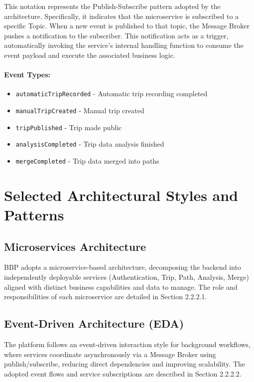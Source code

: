 This notation represents the Publish-Subscribe pattern adopted by the architecture. Specifically, it indicates that the microservice is subscribed to a specific Topic. When a new event is published to that topic, the Message Broker pushes a notification to the subscriber. This notification acts as a trigger, automatically invoking the service's internal handling function to consume the event payload and execute the associated business logic.

\paragraph{Event Types:}
\begin{itemize}
    \item \texttt{automaticTripRecorded} - Automatic trip recording completed
    \item \texttt{manualTripCreated} - Manual trip created
    \item \texttt{tripPublished} - Trip made public
    \item \texttt{analysisCompleted} - Trip data analysis finished
    \item \texttt{mergeCompleted} - Trip data merged into paths
\end{itemize}

\section{Selected Architectural Styles and Patterns}

\subsection{Microservices Architecture}
BBP adopts a microservice-based architecture, decomposing the backend into independently deployable services (Authentication, Trip, Path, Analysis, Merge) aligned with distinct business capabilities and data to manage. The role and responsibilities of each microservice are detailed in Section 2.2.2.1.

\subsection{Event-Driven Architecture (EDA)}
The platform follows an event-driven interaction style for background workflows, where services coordinate asynchronously via a Message Broker using publish/subscribe, reducing direct dependencies and improving scalability. The adopted event flows and service subscriptions are described in Section 2.2.2.2.

